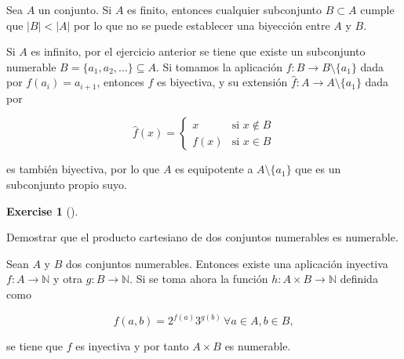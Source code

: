 \documentclass[
  letterpaper,
  DIV=11,
  numbers=noendperiod]{scrreport}
\theoremstyle{definition}
\newtheorem{exercise}{Exercise}[chapter]
\theoremstyle{remark}
\begin{document}
\begin{tcolorbox}[enhanced jigsaw, bottomtitle=1mm, opacityback=0, coltitle=black, toprule=.15mm, colback=white, titlerule=0mm, rightrule=.15mm, title=\textcolor{quarto-callout-tip-color}{\faLightbulb}\hspace{0.5em}{Solución}, breakable, bottomrule=.15mm, colbacktitle=quarto-callout-tip-color!10!white, toptitle=1mm, opacitybacktitle=0.6, left=2mm, leftrule=.75mm, colframe=quarto-callout-tip-color-frame, arc=.35mm]
Sea \(A\) un conjunto. Si \(A\) es finito, entonces cualquier
subconjunto \(B\subset A\) cumple que \(|B| < |A|\) por lo que no se
puede establecer una biyección entre \(A\) y \(B\).

Si \(A\) es infinito, por el ejercicio anterior se tiene que existe un
subconjunto numerable \(B=\{a_1,a_2,\ldots\}\subseteq A\). Si tomamos la
aplicación \(f:B\to B\setminus\{a_1\}\) dada por \(f(a_i)=a_{i+1}\),
entonces \(f\) es biyectiva, y su extensión
\(\hat f: A\to A\setminus\{a_1\}\) dada por

\[
\hat f(x)=
\begin{cases}
x & \mbox{si } x\not\in B\\
f(x) & \mbox{si } x\in B
\end{cases}
\]

es también biyectiva, por lo que \(A\) es equipotente a
\(A\setminus \{a_1\}\) que es un subconjunto propio suyo.
\end{tcolorbox}

\leavevmode{}%
\begin{exercise}[]\label{exr-17}

Demostrar que el producto cartesiano de dos conjuntos numerables es
numerable.

\end{exercise}

\begin{tcolorbox}[enhanced jigsaw, bottomtitle=1mm, opacityback=0, coltitle=black, toprule=.15mm, colback=white, titlerule=0mm, rightrule=.15mm, title=\textcolor{quarto-callout-tip-color}{\faLightbulb}\hspace{0.5em}{Solución}, breakable, bottomrule=.15mm, colbacktitle=quarto-callout-tip-color!10!white, toptitle=1mm, opacitybacktitle=0.6, left=2mm, leftrule=.75mm, colframe=quarto-callout-tip-color-frame, arc=.35mm]
Sean \(A\) y \(B\) dos conjuntos numerables. Entonces existe una
aplicación inyectiva \(f:A\to\mathbb{N}\) y otra \(g:B\to\mathbb{N}\).
Si se toma ahora la función \(h:A\times B\to \mathbb{N}\) definida como

\[ f(a,b) = 2^{f(a)}3^{g(b)}\, \forall a\in A, b\in B,\]

se tiene que \(f\) es inyectiva y por tanto \(A\times B\) es numerable.
\end{tcolorbox}
\end{document}
